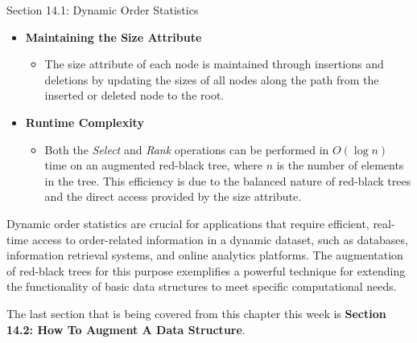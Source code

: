 \begin{notes}{Section 14.1: Dynamic Order Statistics}
\begin{itemize}
        \item \textbf{Maintaining the Size Attribute}
        \begin{itemize}
            \item The size attribute of each node is maintained through insertions and deletions by updating the sizes of all nodes along the path from the inserted or deleted node to the root.
        \end{itemize}
        
        \item \textbf{Runtime Complexity}
        \begin{itemize}
            \item Both the \textit{Select} and \textit{Rank} operations can be performed in $O(\log n)$ time on an augmented red-black tree, where $n$ is the number of elements in the tree. This 
            efficiency is due to the balanced nature of red-black trees and the direct access provided by the size attribute.
        \end{itemize}
    \end{itemize}
    
    \begin{highlight}
        Dynamic order statistics are crucial for applications that require efficient, real-time access to order-related information in a dynamic dataset, such as databases, information retrieval 
        systems, and online analytics platforms. The augmentation of red-black trees for this purpose exemplifies a powerful technique for extending the functionality of basic data structures to meet 
        specific computational needs.
    \end{highlight}    
\end{notes}

The last section that is being covered from this chapter this week is \textbf{Section 14.2: How To Augment A Data Structure}.

